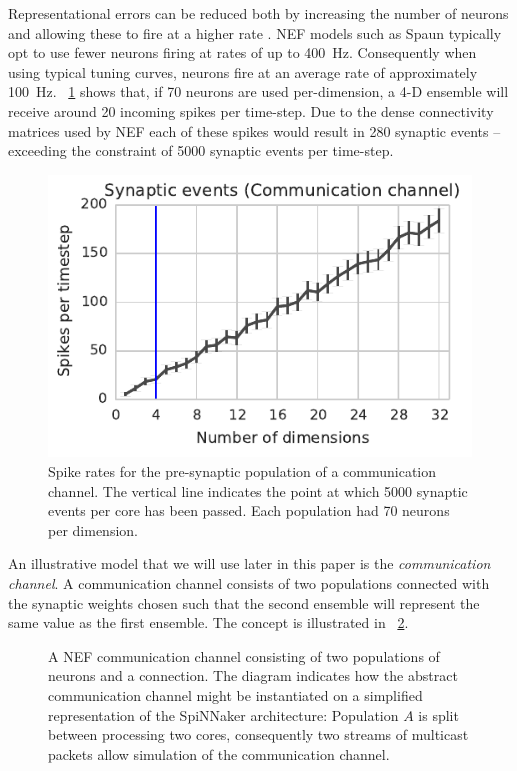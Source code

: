 \documentclass[conference]{IEEEtran}
\begin{document}
Representational errors can be reduced both by increasing the number of neurons and allowing these to fire at a higher rate \parencite{Eliasmith2004}. 
NEF models such as Spaun typically opt to use fewer neurons firing at rates of up to \SI{400}{\hertz}. 
Consequently {\color{red} when using typical tuning curves, neurons fire at an average rate of approximately \SI{100}{\hertz}}. 
\figurename~\ref{fig:results/network-utilisation} shows that, if 70 neurons are used per-dimension, a 4-D ensemble will receive around 20 incoming spikes per time-step.
Due to the dense connectivity matrices used by NEF each of these spikes would result in 280 synaptic events -- exceeding the constraint of 5000 synaptic events per time-step.

  \begin{figure}[!t]
    \centering
    \includegraphics[scale=0.8]{figures/network-1}
    \caption{Spike rates for the pre-synaptic population of a communication channel.  The vertical line indicates the point at which \num{5000} synaptic events per core has been passed. Each population had 70 neurons per dimension.}
    \label{fig:results/network-utilisation}
  \end{figure}

  An illustrative model that we will use later in this paper is the \textit{communication channel}.
  A communication channel consists of two populations connected with the synaptic weights chosen such that the second ensemble will represent the same value as the first ensemble.
  The concept is illustrated in \figurename~\ref{fig:background/comms-channel}.

  \begin{figure}
    \centering
    
    \caption{A NEF communication channel consisting of two populations of neurons and a connection.
    The diagram indicates how the abstract communication channel might be instantiated on a simplified representation of the SpiNNaker architecture:
    Population $A$ is split between processing two cores, consequently two streams of multicast packets allow simulation of the communication channel.
    }
    \label{fig:background/comms-channel}
  \end{figure}
\end{document}
